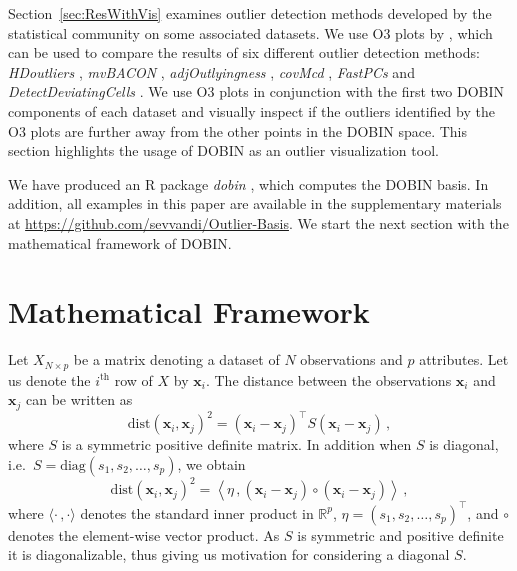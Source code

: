 \documentclass[a4paper,11pt]{article}
\newcommand{\dist}{\text{dist}}
\newcommand{\diag}{\text{diag}}
\begin{document}
Section~\ref{sec:ResWithVis} examines outlier detection methods developed by the statistical community on some associated datasets. We use O3 plots by \cite{unwin2019multivariate}, which can be used to compare the results of six different outlier detection methods: \textit{HDoutliers} \citep{wilkinson2017visualizing}, \textit{mvBACON} \citep{billor2000bacon}, \textit{adjOutlyingness} \citep{brys2005robustification}, \textit{covMcd} \citep{rousseeuw1999fast} , \textit{FastPCs} \citep{vakili2014finding} and \textit{DetectDeviatingCells} \citep{rousseeuw2018detecting}. We use O3 plots in conjunction with the first two DOBIN components of each dataset and visually inspect if the outliers identified by the O3 plots are further away from the other points in the DOBIN space. This section highlights the usage of DOBIN as an outlier visualization tool.

We have produced an R package \textit{dobin} \citep{dobin}, which computes the DOBIN basis. In addition, all examples in this paper are available in the supplementary materials at \url{https://github.com/sevvandi/Outlier-Basis}. We start the next section with the mathematical framework of DOBIN. %

\section{Mathematical Framework}\label{sec:MathFrame}

Let $X_{N \times p}$ be a matrix denoting a dataset of $N$ observations and $p$ attributes. Let us denote the $i^{\text{th}}$ row of $X$ by $\bm{x}_i$. The distance between the observations $\bm{x}_i$ and $\bm{x}_j$ can be written as
\begin{equation}\label{eq:secMF1}
	\dist(\bm{x}_i, \bm{x}_j)^2 = ( \bm{x}_i - \bm{x}_j)^\top S ( \bm{x}_i - \bm{x}_j ) \, ,
\end{equation}
where $S$ is a symmetric positive definite matrix. In addition when $S$ is diagonal, i.e.\ $S = \diag(s_1, s_2, \dots, s_p)$, we obtain
\begin{equation}\label{eq:secMF2}
	\dist(\bm{x}_i, \bm{x}_j)^2 = \left\langle \eta\, , ( \bm{x}_i - \bm{x}_j )\circ ( \bm{x}_i - \bm{x}_j ) \right\rangle \,,
\end{equation}
where $\langle \cdot\, , \cdot \rangle$ denotes the standard inner product in $\mathbb{R}^p$, $\eta = (s_1, s_2, \dots, s_p)^\top$, and $\circ$ denotes the element-wise vector product. As $S$ is symmetric and positive definite it is diagonalizable, thus giving us motivation for considering a diagonal $S$.
\end{document}
